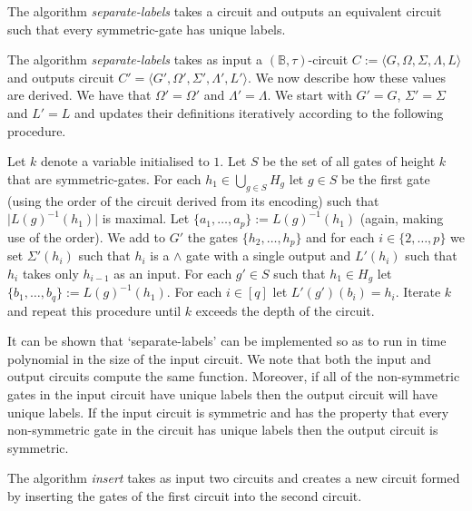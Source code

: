 \documentclass[../paper.tex]{subfiles}
\begin{document}
The algorithm \emph{separate-labels} takes a circuit and outputs an equivalent
circuit such that every symmetric-gate has unique labels.

\begin{definition}
  The algorithm \emph{separate-labels} takes as input a $(\mathbb{B},
  \tau)$-circuit $C := \langle G, \Omega, \Sigma , \Lambda, L \rangle$ and
  outputs circuit $C' = \langle G', \Omega', \Sigma', \Lambda', L' \rangle$. We
  now describe how these values are derived. We have that $\Omega' = \Omega'$
  and $\Lambda' = \Lambda$. We start with $G' = G$, $\Sigma' = \Sigma$ and $L' =
  L$ and updates their definitions iteratively according to the following
  procedure.

  Let $k$ denote a variable initialised to $1$. Let $S$ be the set of all gates
  of height $k$ that are symmetric-gates. For each $h_1 \in \bigcup_{g \in
    S}H_g$ let $g \in S$ be the first gate (using the order of the circuit
  derived from its encoding) such that $\vert L(g)^{-1}(h_1) \vert$ is maximal.
  Let $\{a_1, \ldots, a_p\} := L(g)^{-1}(h_1)$ (again, making use of the order).
  We add to $G'$ the gates $\{h_2, \ldots, h_p\}$ and for each $i \in \{2,
  \ldots, p\}$ we set $\Sigma'(h_i)$ such that $h_i$ is a $\land$ gate with a
  single output and $L'(h_i)$ such that $h_i$ takes only $h_{i-1}$ as an input.
  For each $g' \in S$ such that $h_1 \in H_g$ let $\{ b_1, \ldots, b_q \} :=
  L(g)^{-1}(h_1)$. For each $i \in [q]$ let $L'(g')(b_i) = h_i$. Iterate $k$ and
  repeat this procedure until $k$ exceeds the depth of the circuit.
\end{definition}

It can be shown that `separate-labels' can be implemented so as to run in time
polynomial in the size of the input circuit. We note that both the input and
output circuits compute the same function. Moreover, if all of the non-symmetric
gates in the input circuit have unique labels then the output circuit will have
unique labels. If the input circuit is symmetric and has the property that every
non-symmetric gate in the circuit has unique labels then the output circuit is
symmetric.


The algorithm \emph{insert} takes as input two circuits and creates a new
circuit formed by inserting the gates of the first circuit into the second
circuit.
\end{document}
